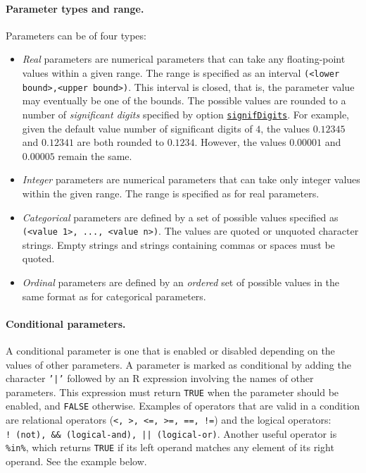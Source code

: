 \documentclass[a4paper]{article}
\newcommand{\aR}{\textsf{R}\xspace}
\newcommand{\parameter}[1]{\hyperlink{opt:#1}{\texttt{#1}}}
\begin{document}
\paragraph{Parameter types and range.}
Parameters can be of four types:
%
\begin{itemize}
\item \textit{Real} parameters are numerical parameters that can take
  any floating-point values within a given range. The range is
  specified as an interval \texttt{(<lower bound>,<upper
    bound>)}. This interval is closed, that is, the parameter value
  may eventually be one of the bounds. The possible values are rounded
  to a number of \emph{significant digits} specified by
  option \parameter{signifDigits}. For example, given the default
  value number of significant digits of $4$, the values $0.12345$ and
  $0.12341$ are both rounded to $0.1234$. However, the values
  $0.00001$ and $0.00005$ remain the same.

\item \textit{Integer} parameters are numerical parameters that can
  take only integer values within the given range. The range is
  specified as for real parameters.

\item \textit{Categorical} parameters are defined by a set of possible
  values specified as \texttt{(<value 1>, ..., <value n>)}. The values
  are quoted or unquoted character strings. Empty strings and strings
  containing commas or spaces must be quoted.

\item \emph{Ordinal} parameters are defined by an \emph{ordered} set
  of possible values in the same format as for categorical parameters.

\end{itemize}


\paragraph{Conditional parameters.} 
A conditional parameter is one that is enabled or disabled depending
on the values of other parameters. A parameter is marked as
conditional by adding the character \texttt{'|'} followed by an \aR
expression involving the names of other parameters. This expression
must return \texttt{TRUE} when the parameter should be enabled, and
\texttt{FALSE} otherwise. Examples of operators that are valid in a condition are relational operators 
(\texttt{<, >, <=, >=, ==, !=}) and the logical operators: \texttt{!~\textrm{(not)}, \&\&~\textrm{(logical-and)},
  ||~\textrm{(logical-or)}}. Another useful operator is
\texttt{\%in\%}, which returns \texttt{TRUE} if its left operand matches any
element of its right operand. See the example below.
\end{document}
